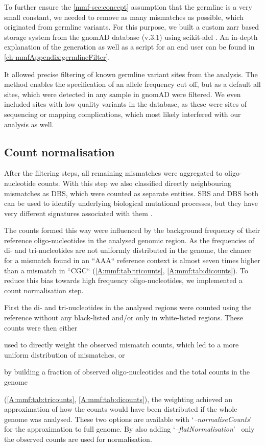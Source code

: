 To further ensure the \autoref{mmf-sec:concept} assumption that the germline is a very small constant, we needed to remove as many mismatches as possible, which originated from germline variants. For this purpose, we built a custom zarr \cite{Miles2021} based storage system from the gnomAD database (v.3.1) \cite{Karczewski2020} using scikit-alel \cite{Miles2021a}.
An in-depth explanation of the generation as well as a script for an end user can be found in \autoref{ch-mmfAppendix:germlineFilter}.

It allowed precise filtering of known germline variant sites from the analysis. The method enables the specification of an allele frequency cut off, but as a default all sites, which were detected in any sample in gnomAD were filtered. We even included sites with low quality variants in the database, as these were sites of sequencing or mapping complications, which most likely interfered with our analysis as well.


\subsection[Count normalisation]{Count normalisation}
\label{mmf-sec:countNorm}
After the filtering steps, all remaining mismatches were aggregated to oligo-nucleotide counts. With this step we also classified directly neighbouring mismatches as DBS, which were counted as separate entities. SBS and DBS both can be used to identify underlying biological mutational processes, but they have very different signatures associated with them \cite{Alexandrov2020}.
 
The counts formed this way were influenced by the background frequency of their reference oligo-nucleotides in the analysed genomic region. As the frequencies of di- and tri-nucleotides are not uniformly distributed in the genome, the chance for a mismatch found in an ``AAA`` reference context is almost seven times higher than a mismatch in ``CGC`` (\autoref{A:mmf:tab:tricounts}, \autoref{A:mmf:tab:dicounts}). To reduce this bias towards high frequency oligo-nucleotides, we implemented a count normalisation step.

First the di- and tri-nucleotides in the analysed regions were counted using the reference without any black-listed and/or only in white-listed regions. These counts were then either \begin{enumerate*}[label={(\roman*)}]
 \item used to directly weight the observed mismatch counts, which led to a more uniform distribution of mismatches, or
 \item by building a fraction of observed oligo-nucleotides and the total counts in the genome
\end{enumerate*} (\autoref{A:mmf:tab:tricounts}, \autoref{A:mmf:tab:dicounts}), the weighting achieved an approximation of how the counts would have been distributed if the whole genome was analysed. These two options are available with \lq\emph{--normaliseCounts}\rq~ for the approximation to full genome. By also adding \lq\emph{--flatNormalisation}\rq~ only the observed counts are used for normalisation.

